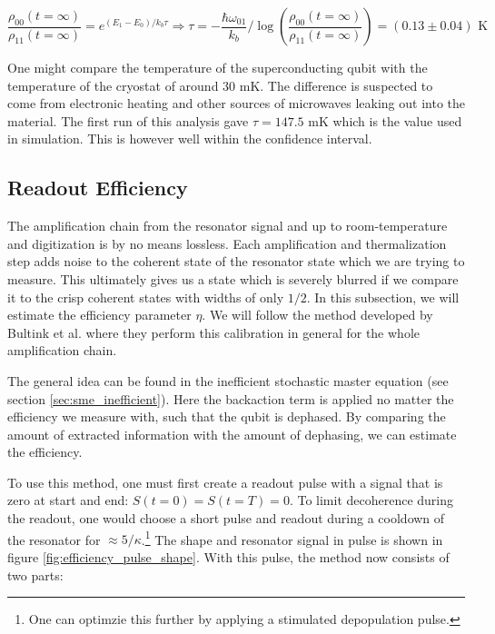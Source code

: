 \begin{fullwidth}
\begin{equation}
    \frac{\rho_{00}(t=\infty)}{\rho_{11}(t=\infty)} = e^{(E_1 - E_0) / k_b \tau} \Rightarrow \tau = - \frac{\hbar \omega_{01}}{k_b} / \log\left(\frac{\rho_{00}(t=\infty)}{\rho_{11}(t=\infty)}\right)  =  (0.13 \pm 0.04) \text{ K}
\end{equation}
\end{fullwidth}
One might compare the temperature of the superconducting qubit with the temperature of the cryostat of around 30 mK. The difference is suspected to come from electronic heating and other sources of microwaves leaking out into the material. The first run of this analysis gave $\tau =  147.5 \text{ mK}$ which is the value used in simulation. This is however well within the confidence interval.


\subsection{Readout Efficiency}\label{sec:readout_efficiency}
The amplification chain from the resonator signal and up to room-temperature and digitization is by no means lossless. Each amplification and thermalization step adds noise to the coherent state of the resonator state which we are trying to measure. This ultimately gives us a state which is severely blurred if we compare it to the crisp coherent states with widths of only $1/2$. In this subsection, we will estimate the efficiency parameter $\eta$. We will follow the method developed by Bultink et al. \cite{bultink_general_2018} where they perform this calibration in general for the whole amplification chain.

The general idea can be found in the inefficient stochastic master equation (see section \ref{sec:sme_inefficient}). Here the backaction term is applied no matter the efficiency we measure with, such that the qubit is dephased. By comparing the amount of extracted information with the amount of dephasing, we can estimate the efficiency. %

To use this method, one must first create a readout pulse with a signal that is zero at start and end: $S(t = 0) = S(t = T) = 0$. To limit decoherence during the readout, one would choose a short pulse and readout during a cooldown of the resonator for $\approx 5 / \kappa$.\footnote{One can optimzie this further by applying a stimulated depopulation pulse.} The shape and resonator signal in pulse is shown in figure \ref{fig:efficiency_pulse_shape}. With this pulse, the method now consists of two parts:

